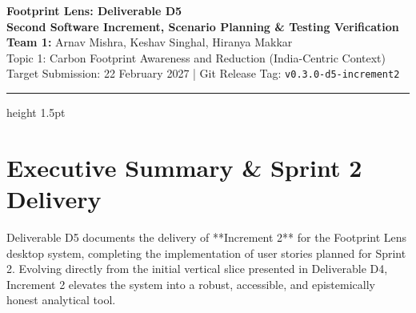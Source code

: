 \documentclass[12pt,a4paper]{article}
\begin{document}
\begin{center}
    {\LARGE\bfseries\color{primary} Footprint Lens: Deliverable D5}\\[4pt]
    {\Large\bfseries\color{secondary} Second Software Increment, Scenario Planning \& Testing Verification}\\[8pt]
    {\large\textbf{Team 1:} Arnav Mishra, Keshav Singhal, Hiranya Makkar}\\[2pt]
    {\small Topic 1: Carbon Footprint Awareness and Reduction (India-Centric Context)}\\[2pt]
    {\small Target Submission: 22 February 2027 | Git Release Tag: \texttt{v0.3.0-d5-increment2}}
\end{center}

\vspace{-6pt}
\hrule height 1.5pt \relax
\vspace{10pt}

\section{Executive Summary \& Sprint 2 Delivery}

Deliverable D5 documents the delivery of **Increment 2** for the Footprint Lens desktop system, completing the implementation of user stories planned for Sprint 2. Evolving directly from the initial vertical slice presented in Deliverable D4, Increment 2 elevates the system into a robust, accessible, and epistemically honest analytical tool. 
\end{document}
